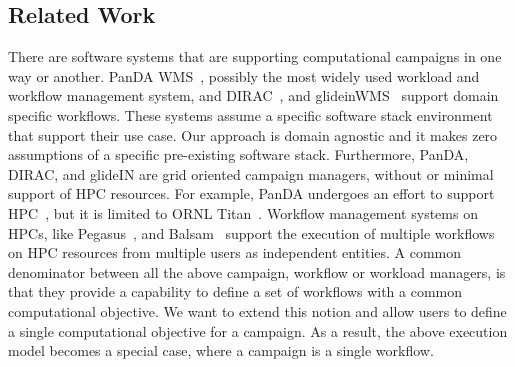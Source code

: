 \subsection{Related Work}

There are software systems that are supporting computational campaigns in one way or another. 
PanDA WMS~\cite{maeno2008panda,maeno2014evolution}, possibly the most widely used workload and workflow management system, and DIRAC~\cite{casajus2010dirac}, and glideinWMS~\cite{sfiligoi2008glidein} support domain specific workflows.
These systems assume a specific software stack environment that support their use case.
Our approach is domain agnostic and it makes zero assumptions of a specific pre-existing software stack. 
Furthermore, PanDA, DIRAC, and glideIN are grid oriented campaign managers, without or minimal support of HPC resources.
For example, PanDA undergoes an effort to support HPC~\cite{de2016accelerating}, but it is limited to ORNL Titan~\cite{titan}.
Workflow management systems on HPCs, like Pegasus~\cite{deelman2015pegasus}, and Balsam~\cite{salim2019balsam} support the execution of multiple workflows on HPC resources from multiple users as independent entities.
A common denominator between all the above campaign, workflow or workload managers, is that they provide a capability to define a set of workflows with a common computational objective.
We want to extend this notion and allow users to define a single computational objective for a campaign.
As a result, the above execution model becomes a special case, where a campaign is a single workflow.